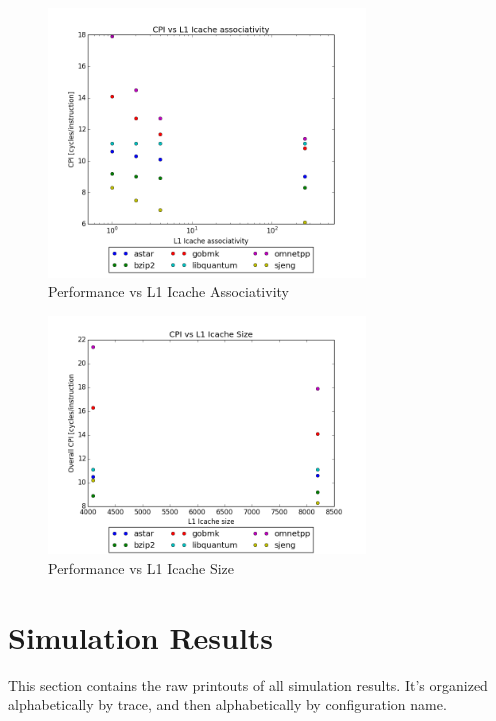 \documentclass{article}
\begin{document}
\begin{figure}[ht]
    \centering
    \includegraphics[width=0.75\textwidth]{plots/CPI_vs_L1icache_assoc.png}
    \caption{Performance vs L1 Icache Associativity}
    \label{fig:cpivsl1iassoc}
\end{figure}

\begin{figure}[ht]
    \centering
    \includegraphics[width=0.75\textwidth]{plots/CPI_vs_L1icache_size.png}
    \caption{Performance vs L1 Icache Size}
    \label{fig:cpivsl1isize}
\end{figure}






\clearpage
\appendix
\section{Simulation Results}

This section contains the raw printouts of all simulation results. It's
organized alphabetically by trace, and then alphabetically by configuration
name.
\end{document}
